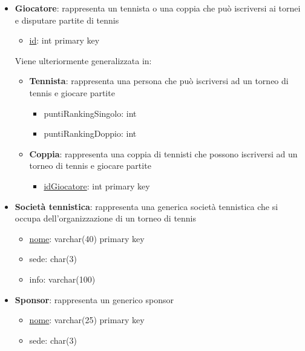\documentclass[10pt]{article}
\begin{document}
\begin{itemize}
    \item \textbf{Giocatore}: rappresenta un tennista o una coppia che può iscriversi ai tornei e disputare partite di tennis
        \begin{itemize}
                \item \underline{id}: int primary key
        \end{itemize}
        Viene ulteriormente generalizzata in:
        \begin{itemize}
            \item \textbf{Tennista}: rappresenta una persona che può iscriversi ad un torneo di tennis e giocare partite
            \begin{itemize}
                \item puntiRankingSingolo: int
                \item puntiRankingDoppio: int
            \end{itemize}
            \item \textbf{Coppia}: rappresenta una coppia di tennisti che possono iscriversi ad un torneo di tennis e giocare partite
            \begin{itemize}
                \item \underline{idGiocatore}: int primary key
            \end{itemize}
        \end{itemize}
    
    \item \textbf{Società tennistica}: rappresenta una generica società tennistica che si occupa dell'organizzazione di un torneo di tennis
    \begin{itemize}
        \item \underline{nome}: varchar(40) primary key
        \item sede: char(3)
        \item info: varchar(100)
    \end{itemize}
    
    \item \textbf{Sponsor}: rappresenta un generico sponsor
    \begin{itemize}
        \item \underline{nome}: varchar(25) primary key
        \item sede: char(3)
    \end{itemize}
    

\end{itemize}
\end{document}
